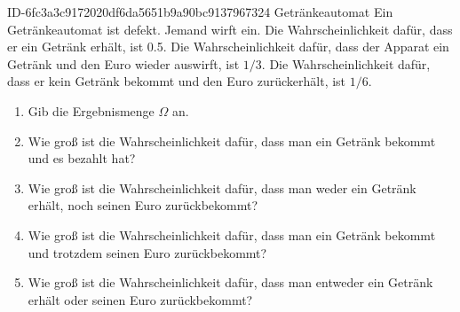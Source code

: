 \begin{exercise}
      {ID-6fc3a3c9172020df6da5651b9a90bc9137967324}
      {Getränkeautomat}
  \ifproblem\problem
    Ein Getränkeautomat ist defekt. Jemand wirft  ein. Die Wahrscheinlichkeit
    dafür, dass er ein Getränk erhält, ist \num{0.5}. Die Wahrscheinlichkeit dafür,
    dass der Apparat ein Getränk und den Euro wieder auswirft, ist $1/3$.
    Die Wahrscheinlichkeit dafür, dass er kein Getränk bekommt und den Euro
    zurückerhält, ist $1/6$.
    \begin{enumerate}
      \item Gib die Ergebnismenge $\Omega$ an.
      \item Wie groß ist die Wahrscheinlichkeit dafür, dass man ein Getränk
            bekommt und es bezahlt hat?
      \item Wie groß ist die Wahrscheinlichkeit dafür, dass man weder ein
            Getränk erhält, noch seinen Euro zurückbekommt?
      \item Wie groß ist die Wahrscheinlichkeit dafür, dass man ein Getränk
            bekommt und trotzdem seinen Euro zurückbekommt?
      \item Wie groß ist die Wahrscheinlichkeit dafür, dass man entweder
            ein Getränk erhält oder seinen Euro zurückbekommt?
    \end{enumerate}
  \fi
\end{exercise}
